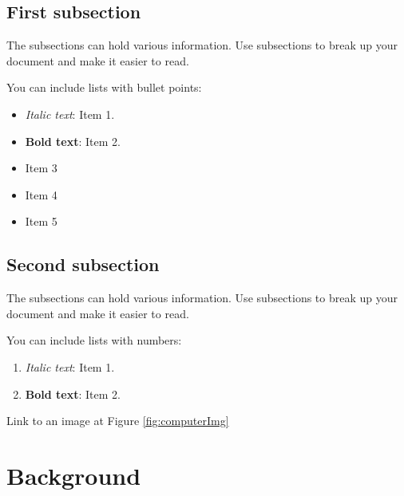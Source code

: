 \documentclass[twocolumn]{article}
\begin{document}
\subsection{First subsection}

The subsections can hold various information. Use subsections to break up your document and make it easier to read.

You can include lists with bullet points:

\begin{itemize}
\item \textit{Italic text}: Item 1.  
  \item \textbf{Bold text}: Item 2. 
  \item Item 3
  \item Item 4
  \item Item 5
\end{itemize}
	
\subsection{Second subsection}

The subsections can hold various information. Use subsections to break up your document and make it easier to read.

You can include lists with numbers:

\begin{enumerate}
  \item \textit{Italic text}: Item 1.  
  \item \textbf{Bold text}: Item 2. 
\end{enumerate}

Link to an image at Figure \ref{fig:computerImg}

	

\section{Background}
\vspace{-1ex}
\end{document}
